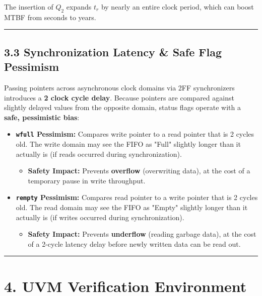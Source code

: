 \documentclass[
]{article}
\providecommand{\tightlist}{%
  \setlength{\itemsep}{0pt}\setlength{\parskip}{0pt}}
\begin{document}
The insertion of \(Q_2\) expands \(t_r\) by nearly an entire clock
period, which can boost MTBF from seconds to years.

\begin{center}\rule{0.5\linewidth}{0.5pt}\end{center}

\subsection{3.3 Synchronization Latency \& Safe Flag
Pessimism}\label{33-synchronization-latency--safe-flag-pessimism}

Passing pointers across asynchronous clock domains via 2FF synchronizers
introduces a \textbf{2 clock cycle delay}. Because pointers are compared
against slightly delayed values from the opposite domain, status flags
operate with a \textbf{safe, pessimistic bias}:

\begin{itemize}
\item
  \textbf{\texttt{wfull} Pessimism:} Compares write pointer to a read
  pointer that is 2 cycles old. The write domain may see the FIFO as
  "Full" slightly longer than it actually is (if reads occurred during
  synchronization).

  \begin{itemize}
  \tightlist
  \item
    \textbf{Safety Impact:} Prevents \textbf{overflow} (overwriting
    data), at the cost of a temporary pause in write throughput.
  \end{itemize}
\item
  \textbf{\texttt{rempty} Pessimism:} Compares read pointer to a write
  pointer that is 2 cycles old. The read domain may see the FIFO as
  "Empty" slightly longer than it actually is (if writes occurred during
  synchronization).

  \begin{itemize}
  \tightlist
  \item
    \textbf{Safety Impact:} Prevents \textbf{underflow} (reading garbage
    data), at the cost of a 2-cycle latency delay before newly written
    data can be read out.
  \end{itemize}
\end{itemize}

\begin{center}\rule{0.5\linewidth}{0.5pt}\end{center}

\section{4. UVM Verification
Environment}\label{4-uvm-verification-environment}
\end{document}
